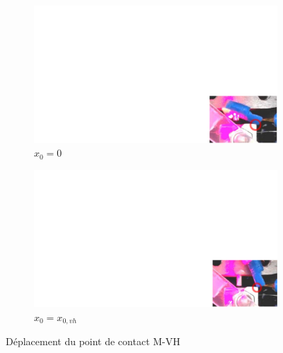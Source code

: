 \begin{figure}[!htbp]
\begin{center}
	\begin{subfigure}[b]{0.49\textwidth}
    \captionsetup{justification=centering} 
	\includegraphics[trim={24.7cm 0cm 0cm 12.5cm},clip,width=\textwidth]{../Chap6/Figure/deplacement_zlat_xm=0.pdf}
	\caption{$x_0=0$}
	\label{fig:deplacement_zlat_xm=0}
	\end{subfigure}
\hfillx
	\begin{subfigure}[b]{0.49\textwidth}
    \captionsetup{justification=centering} 
	\includegraphics[trim={24.7cm 0cm 0cm 12.5cm},clip,width=\textwidth]{../Chap6/Figure/deplacement_zlat_xm=x0.pdf}
	\caption{$x_0=x_{0,vh}$}
	\label{fig:deplacement_zlat_xm=x0}
	\end{subfigure}
	\caption{Déplacement du point de contact M-VH}
	\label{fig:deplacement_zlat}
\end{center}	
\end{figure} 
